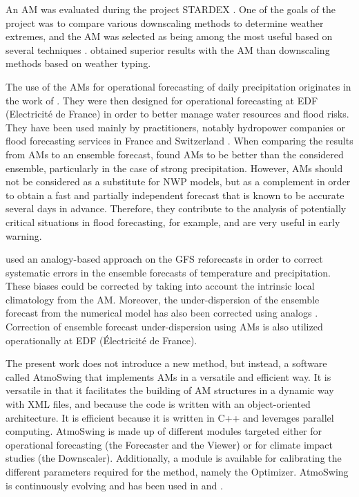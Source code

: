 \documentclass[review]{elsarticle}
\begin{document}
An AM was evaluated during the project STARDEX \citep[\textit{STAtistical and Regional dynamical Downscaling of EXtremes for European regions}, see][]{Goodess2003, Stardex2005}. One of the goals of the project was to compare various downscaling methods to determine weather extremes, and the AM was selected as being among the most useful based on several techniques \citep{Maheras2005, Schmidli2007}. \citet{Bliefernicht2010} obtained superior results with the AM than downscaling methods based on weather typing.

The use of the AMs for operational forecasting of daily precipitation originates in the work of \citet{Duband1970, Duband1974, Duband1981}. They were then designed for operational forecasting at EDF (Electricit\'{e} de France) in order to better manage water resources and flood risks. They have been used mainly by practitioners, notably hydropower companies \citep{Desaint2008a, BenDaoud2009, Obled2014} or flood forecasting services in France and Switzerland \citep{Marty2010, GarciaHernandez2009b, Horton2012}. When comparing the results from AMs to an ensemble forecast, \citet{Marty2010} found AMs to be better than the considered ensemble, particularly in the case of strong precipitation. However, AMs should not be considered as a substitute for NWP models, but as a complement in order to obtain a fast and partially independent forecast that is known to be accurate several days in advance. Therefore, they contribute to the analysis of potentially critical situations in flood forecasting, for example, and are very useful in early warning.

\citet{Hamill2006} used an analogy-based approach on the GFS reforecasts in order to correct systematic errors in the ensemble forecasts of temperature and precipitation. These biases could be corrected by taking into account the intrinsic local climatology from the AM. Moreover, the under-dispersion of the ensemble forecast from the numerical model has also been corrected using analogs \citep{Hamill2006}. Correction of ensemble forecast under-dispersion using AMs is also utilized operationally at EDF (\'{E}lectricit\'{e} de France).

The present work does not introduce a new method, but instead, a software called AtmoSwing that implements AMs in a versatile and efficient way. It is versatile in that it facilitates the building of AM structures in a dynamic way with XML files, and because the code is written with an object-oriented architecture. It is efficient because it is written in C++ and leverages parallel computing. AtmoSwing is made up of different modules targeted either for operational forecasting (the Forecaster and the Viewer) or for climate impact studies (the Downscaler). Additionally, a module is available for calibrating the different parameters required for the method, namely the Optimizer. AtmoSwing is continuously evolving and has been used in \citet{Horton2012, Horton2017a, Horton2017b, Horton2018a} and \citet{Horton2018b}.
\end{document}
